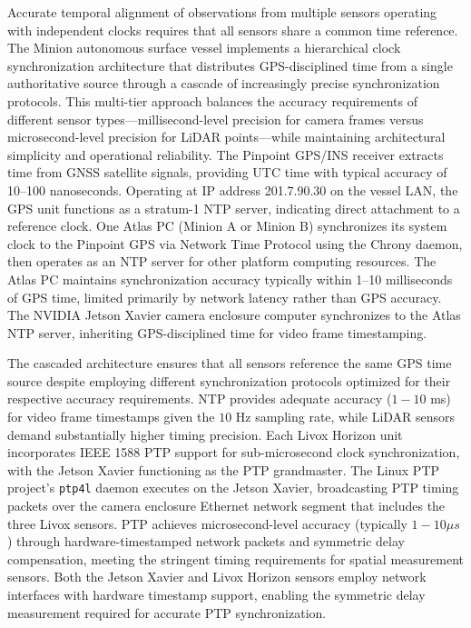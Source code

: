 \documentclass{erauthesis}
\begin{document}
Accurate temporal alignment of observations from multiple sensors operating with independent clocks requires that all sensors share a common time reference. The Minion autonomous surface vessel implements a hierarchical clock synchronization architecture that distributes GPS-disciplined time from a single authoritative source through a cascade of increasingly precise synchronization protocols. This multi-tier approach balances the accuracy requirements of different sensor types---millisecond-level precision for camera frames versus microsecond-level precision for LiDAR points---while maintaining architectural simplicity and operational reliability.
The Pinpoint GPS/INS receiver extracts time from GNSS satellite signals, providing UTC time with typical accuracy of 10--100 nanoseconds. Operating at IP address 201.7.90.30 on the vessel LAN, the GPS unit functions as a stratum-1 \ac{NTP} server, indicating direct attachment to a reference clock. One Atlas PC (Minion A or Minion B) synchronizes its system clock to the Pinpoint GPS via Network Time Protocol using the Chrony daemon, then operates as an \ac{NTP} server for other platform computing resources. The Atlas PC maintains synchronization accuracy typically within 1--10 milliseconds of GPS time, limited primarily by network latency rather than GPS accuracy. The NVIDIA Jetson Xavier camera enclosure computer synchronizes to the Atlas \ac{NTP} server, inheriting GPS-disciplined time for video frame timestamping.

The cascaded architecture ensures that all sensors reference the same GPS time source despite employing different synchronization protocols optimized for their respective accuracy requirements.
\ac{NTP} provides adequate accuracy ($1-10$ ms) for video frame timestamps given the $10$ Hz sampling rate, while LiDAR sensors demand substantially higher timing precision. 
Each Livox Horizon unit incorporates IEEE 1588 \ac{PTP} support for sub-microsecond clock synchronization, with the Jetson Xavier functioning as the \ac{PTP} grandmaster. 
The Linux \ac{PTP} project's \texttt{ptp4l} daemon executes on the Jetson Xavier, broadcasting \ac{PTP} timing packets over the camera enclosure Ethernet network segment that includes the three Livox sensors. 
\ac{PTP} achieves microsecond-level accuracy (typically $1-10 \mu s$) through hardware-timestamped network packets and symmetric delay compensation, meeting the stringent timing requirements for spatial measurement sensors. 
Both the Jetson Xavier and Livox Horizon sensors employ network interfaces with hardware timestamp support, enabling the symmetric delay measurement required for accurate \ac{PTP} synchronization.
\end{document}
